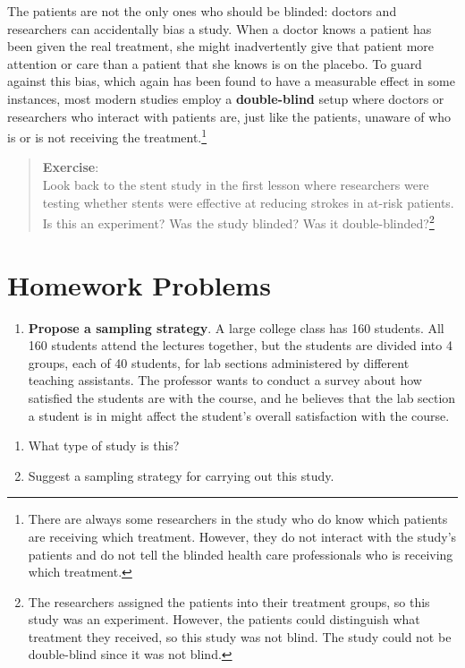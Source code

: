 \documentclass[
]{book}
\providecommand{\tightlist}{%
  \setlength{\itemsep}{0pt}\setlength{\parskip}{0pt}}
\begin{document}
The patients are not the only ones who should be blinded: doctors and researchers can accidentally bias a study. When a doctor knows a patient has been given the real treatment, she might inadvertently give that patient more attention or care than a patient that she knows is on the placebo. To guard against this bias, which again has been found to have a measurable effect in some instances, most modern studies employ a \textbf{double-blind} setup where doctors or researchers who interact with patients are, just like the patients, unaware of who is or is not receiving the treatment.\footnote{There are always some researchers in the study who do know which patients are receiving which treatment. However, they do not interact with the study's patients and do not tell the blinded health care professionals who is receiving which treatment.}

\begin{quote}
\textbf{Exercise}:\\
Look back to the stent study in the first lesson where researchers were testing whether stents were effective at reducing strokes in at-risk patients. Is this an experiment? Was the study blinded? Was it double-blinded?\footnote{The researchers assigned the patients into their treatment groups, so this study was an experiment. However, the patients could distinguish what treatment they received, so this study was not blind. The study could not be double-blind since it was not blind.}
\end{quote}

\hypertarget{homework-problems-3}{%
\section{Homework Problems}\label{homework-problems-3}}

\begin{enumerate}
\def\labelenumi{\arabic{enumi}.}
\tightlist
\item
  \textbf{Propose a sampling strategy}. A large college class has 160 students. All 160 students attend the lectures together, but the students are divided into 4 groups, each of 40 students, for lab sections administered by different teaching assistants. The professor wants to conduct a survey about how satisfied the students are with the course, and he believes that the lab section a student is in might affect the student's overall satisfaction with the course.
\end{enumerate}

\begin{enumerate}
\def\labelenumi{\alph{enumi}.}
\tightlist
\item
  What type of study is this?\\
\item
  Suggest a sampling strategy for carrying out this study.
\end{enumerate}
\end{document}
